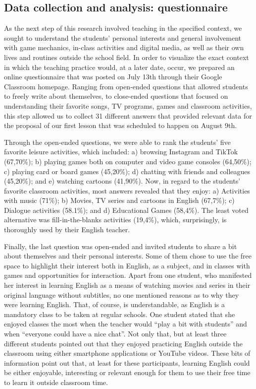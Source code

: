 \documentclass[english]{textolivre}
\begin{document}
\subsection{Data collection and analysis: questionnaire}

As the next step of this research involved teaching in the specified context, we sought to understand the students’ personal interests and general involvement with game mechanics, in-class activities and digital media, as well as their own lives and routines outside the school field. In order to visualize the exact context in which the teaching practice would, at a later date, occur, we prepared an online questionnaire that was posted on July 13th through their Google Classroom homepage. Ranging from open-ended questions that allowed students to freely write about themselves, to close-ended questions that focused on understanding their favorite songs, TV programs, games and classroom activities, this step allowed us to collect 31 different answers that provided relevant data for the proposal of our first lesson that was scheduled to happen on August 9th.

Through the open-ended questions, we were able to rank the students’ five favorite leisure activities, which included: a) browsing Instagram and TikTok (67,70\%); b) playing games both on computer and video game consoles (64,50\%); c) playing card or board games (45,20\%); d) chatting with friends and colleagues (45,20\%); and e) watching cartoons (41,90\%). Now, in regard to the students’ favorite classroom activities, most answers revealed that they enjoy: a) Activities with music (71\%); b) Movies, TV series and cartoons in English (67,7\%); c) Dialogue activities (58.1\%); and d) Educational Games (58,4\%). The least voted alternative was fill-in-the-blanks activities (19,4\%), which, surprisingly, is thoroughly used by their English teacher.

Finally, the last question was open-ended and invited students to share a bit about themselves and their personal interests. Some of them chose to use the free space to highlight their interest both in English, as a subject, and in classes with games and opportunities for interaction. Apart from one student, who manifested her interest in learning English as a means of watching movies and series in their original language without subtitles, no one mentioned reasons as to why they were learning English. That, of course, is understandable, as English is a mandatory class to be taken at regular schools. One student stated that she enjoyed classes the most when the teacher would “play a bit with students” and when “everyone could have a nice chat”. Not only that, but at least three different students pointed out that they enjoyed practicing English outside the classroom using either smartphone applications or YouTube videos. These bits of information point out that, at least for these participants, learning English could be either enjoyable, interesting or relevant enough for them to use their free time to learn it outside classroom time.
\end{document}
